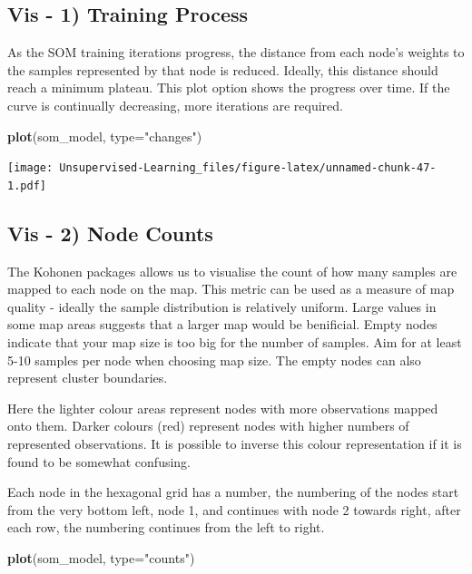\documentclass[
]{book}
\newenvironment{Shaded}{\begin{snugshade}}{\end{snugshade}}
\newcommand{\DataTypeTok}[1]{\textcolor[rgb]{0.13,0.29,0.53}{#1}}
\newcommand{\KeywordTok}[1]{\textcolor[rgb]{0.13,0.29,0.53}{\textbf{#1}}}
\newcommand{\NormalTok}[1]{#1}
\newcommand{\StringTok}[1]{\textcolor[rgb]{0.31,0.60,0.02}{#1}}
\begin{document}
\hypertarget{vis---1-training-process}{%
\subsection{Vis - 1) Training Process}\label{vis---1-training-process}}

As the SOM training iterations progress, the distance from each node's weights to the samples represented by that node is reduced. Ideally, this distance should reach a minimum plateau.
This plot option shows the progress over time.
If the curve is continually decreasing, more iterations are required.

\begin{Shaded}
\begin{Highlighting}[]
\KeywordTok{plot}\NormalTok{(som_model, }\DataTypeTok{type=}\StringTok{"changes"}\NormalTok{)}
\end{Highlighting}
\end{Shaded}

\texttt{[image: Unsupervised-Learning\_files/figure-latex/unnamed-chunk-47-1.pdf]}

\hypertarget{vis---2-node-counts}{%
\subsection{Vis - 2) Node Counts}\label{vis---2-node-counts}}

The Kohonen packages allows us to visualise the count of how many samples are mapped to each node on the map.
This metric can be used as a measure of map quality - ideally the sample distribution is relatively uniform.
Large values in some map areas suggests that a larger map would be benificial.
Empty nodes indicate that your map size is too big for the number of samples.
Aim for at least 5-10 samples per node when choosing map size. The empty nodes can also represent cluster boundaries.

Here the lighter colour areas represent nodes with more observations mapped onto them. Darker colours (red) represent nodes with higher numbers of represented observations. It is possible to inverse this colour representation if it is found to be somewhat confusing.

Each node in the hexagonal grid has a number, the numbering of the nodes start from the very bottom left, node 1, and continues with node 2 towards right, after each row, the numbering continues from the left to right.

\begin{Shaded}
\begin{Highlighting}[]
\KeywordTok{plot}\NormalTok{(som_model, }\DataTypeTok{type=}\StringTok{"counts"}\NormalTok{)}
\end{Highlighting}
\end{Shaded}
\end{document}
